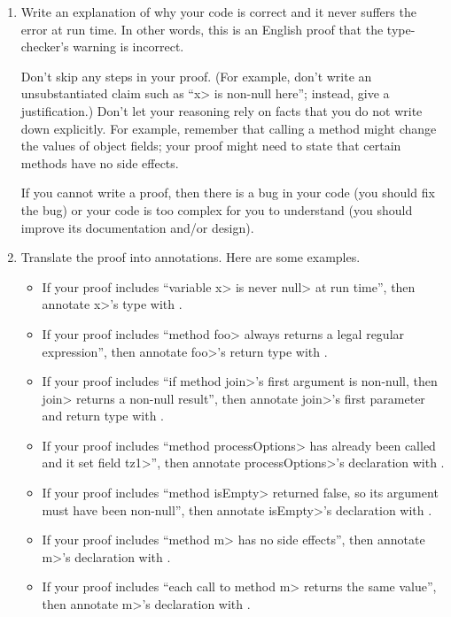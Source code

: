 \begin{enumerate}
\item
  Write an explanation of why your code is correct and it
  never suffers the error at run time.  In other words, this is an English proof
  that the type-checker's warning is incorrect.

  Don't skip any steps in your proof.
  (For example, don't write an unsubstantiated claim such as ``\<x> is
  non-null here''; instead, give a justification.)
  Don't let your reasoning rely on
  facts that you do not write down explicitly.  For example, remember that
  calling a method might change the values of object fields; your proof
  might need to state that certain methods have no side effects.

  If you cannot write a proof, then there is a bug
  in your code (you should fix the bug) or your code is too complex for you
  to understand (you should improve its documentation and/or design).

\item
  Translate the proof into annotations.  Here are some examples.

  \begin{itemize}
  \item
    If your proof includes ``variable \<x> is never \<null>
    at run time'', then annotate \<x>'s type with
    .
  \item
    If your proof
    includes ``method \<foo> always returns a legal regular expression'',
    then annotate \<foo>'s return type with
    .
  \item
    If your proof includes ``if method \<join>'s first argument is
    non-null, then \<join> returns a non-null result'', then annotate
    \<join>'s first parameter and return type with
    .
  \item
    If your proof includes ``method \<processOptions> has already been called and it
    set field \<tz1>'', then annotate \<processOptions>'s declaration with
    .
  \item
    If your proof includes ``method \<isEmpty> returned false, so its
    argument must have been non-null'', then annotate \<isEmpty>'s
    declaration with
    .
  \item
    If your proof includes ``method \<m> has no side effects'',
    then annotate \<m>'s declaration with
    .
  \item
    If your proof includes ``each call to method \<m> returns the same value'',
    then annotate \<m>'s declaration with
    .
  \end{itemize}


\end{enumerate}
